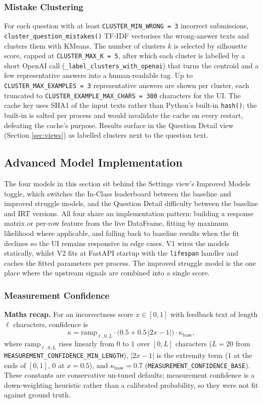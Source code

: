 \subsubsection{Mistake Clustering}

For each question with at least \texttt{CLUSTER\_MIN\_WRONG = 3} incorrect submissions, \texttt{cluster\_question\_mistakes()} TF-IDF vectorises the wrong-answer texts and clusters them with KMeans.
The number of clusters $k$ is selected by silhouette score, capped at \texttt{CLUSTER\_MAX\_K = 5}, after which each cluster is labelled by a short OpenAI call (\texttt{\_label\_clusters\_with\_openai}) that turns the centroid and a few representative answers into a human-readable tag.
Up to \texttt{CLUSTER\_MAX\_EXAMPLES = 3} representative answers are shown per cluster, each truncated to \texttt{CLUSTER\_EXAMPLE\_MAX\_CHARS = 300} characters for the UI.
The cache key uses SHA1 of the input texts rather than Python's built-in \texttt{hash()}; the built-in is salted per process and would invalidate the cache on every restart, defeating the cache's purpose.
Results surface in the Question Detail view (Section \ref{sec:views}) as labelled clusters next to the question text.


\subsection{Advanced Model Implementation} \label{sec:advanced}

The four models in this section sit behind the Settings view's Improved Models toggle, which switches the In-Class leaderboard between the baseline and improved struggle models, and the Question Detail difficulty between the baseline and IRT versions.
All four share an implementation pattern: building a response matrix or per-row feature from the live DataFrame, fitting by maximum likelihood where applicable, and falling back to baseline results when the fit declines so the UI remains responsive in edge cases.
V1 wires the models statically, whilst V2 fits at FastAPI startup with the \texttt{lifespan} handler and caches the fitted parameters per process.
The improved struggle model is the one place where the upstream signals are combined into a single score.
\subsubsection{Measurement Confidence}
\textbf{Maths recap.}
For an incorrectness score $x \in [0, 1]$ with feedback text of length $\ell$ characters, confidence is
\[
\kappa = \mathrm{ramp}_{\ell, 0, L} \cdot \big(0.5 + 0.5\,|2x - 1|\big) \cdot \kappa_{\text{base}},
\]
where $\mathrm{ramp}_{\ell, 0, L}$ rises linearly from $0$ to $1$ over $[0, L]$ characters ($L = 20$ from \texttt{MEASUREMENT\_CONFIDENCE\_MIN\_LENGTH}), $|2x - 1|$ is the extremity term (1 at the ends of $[0,1]$, 0 at $x = 0.5$), and $\kappa_{\text{base}} = 0.7$ (\texttt{MEASUREMENT\_CONFIDENCE\_BASE}). These constants are conservative un-tuned defaults; measurement confidence is a down-weighting heuristic rather than a calibrated probability, so they were not fit against ground truth.

